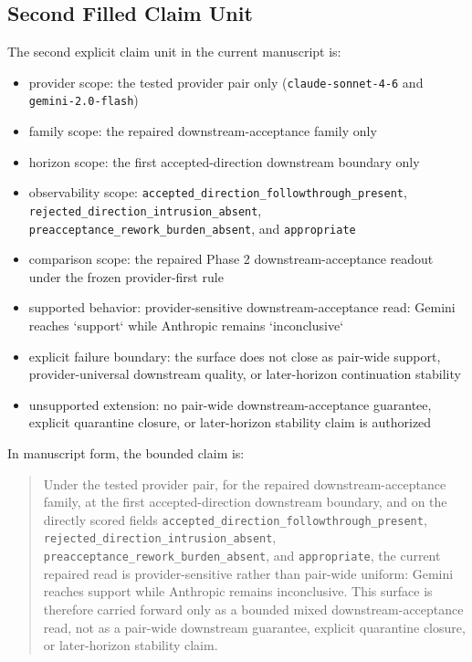 \documentclass[11pt]{article}
\begin{document}
\subsection{Second Filled Claim Unit}

The second explicit claim unit in the current manuscript is:

\begin{itemize}
\item provider scope:
  the tested provider pair only (\texttt{claude-sonnet-4-6} and
  \texttt{gemini-2.0-flash})
\item family scope:
  the repaired downstream-acceptance family only
\item horizon scope:
  the first accepted-direction downstream boundary only
\item observability scope:
  \texttt{accepted\_direction\_followthrough\_present},
  \texttt{rejected\_direction\_intrusion\_absent},
  \texttt{preacceptance\_rework\_burden\_absent}, and \texttt{appropriate}
\item comparison scope:
  the repaired Phase 2 downstream-acceptance readout under the frozen
  provider-first rule
\item supported behavior:
  provider-sensitive downstream-acceptance read:
  Gemini reaches `support` while Anthropic remains `inconclusive`
\item explicit failure boundary:
  the surface does not close as pair-wide support, provider-universal
  downstream quality, or later-horizon continuation stability
\item unsupported extension:
  no pair-wide downstream-acceptance guarantee, explicit quarantine closure, or
  later-horizon stability claim is authorized
\end{itemize}

In manuscript form, the bounded claim is:

\begin{quote}
Under the tested provider pair, for the repaired downstream-acceptance family,
at the first accepted-direction downstream boundary, and on the directly scored
fields
\texttt{accepted\_direction\_followthrough\_present},
\texttt{rejected\_direction\_intrusion\_absent},
\texttt{preacceptance\_rework\_burden\_absent}, and \texttt{appropriate}, the
current repaired read is provider-sensitive rather than pair-wide uniform:
Gemini reaches support while Anthropic remains inconclusive. This surface is
therefore carried forward only as a bounded mixed downstream-acceptance read,
not as a pair-wide downstream guarantee, explicit quarantine closure, or
later-horizon stability claim.
\end{quote}
\end{document}
